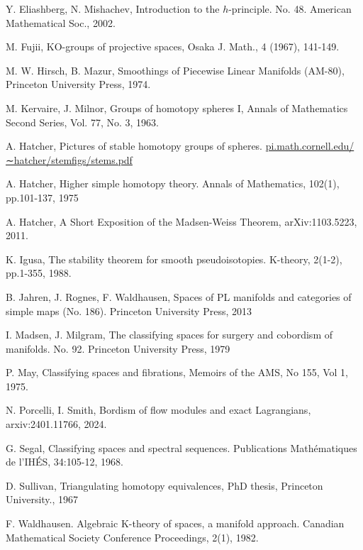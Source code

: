 \documentclass[reqno]{amsart}
\theoremstyle{theorem}
\theoremstyle{remark}
\theoremstyle{definition}
\begin{document}
\begin{thebibliography}{}
 Y. Eliashberg, N. Mishachev, Introduction to the $ h $-principle. No. 48. American Mathematical Soc., 2002.

 M. Fujii, KO-groups of projective spaces, Osaka J. Math., 4 (1967), 141-149.
   

 M. W. Hirsch, B. Mazur, Smoothings of Piecewise Linear Manifolds (AM-80), Princeton University Press, 1974.
  
 M. Kervaire, J. Milnor, Groups of homotopy spheres I, Annals of Mathematics Second Series, Vol. 77, No. 3, 1963.


 A. Hatcher, Pictures of stable homotopy groups of spheres. \url{pi.math.cornell.edu/∼hatcher/stemfigs/stems.pdf}

   
 A. Hatcher,  Higher simple homotopy theory. Annals of Mathematics, 102(1), pp.101-137, 1975
   
   
 A. Hatcher, A Short Exposition of the Madsen-Weiss Theorem, arXiv:1103.5223, 2011.


 K. Igusa, The stability theorem for smooth pseudoisotopies. K-theory, 2(1-2), pp.1-355, 1988.


 B. Jahren, J. Rognes,  F. Waldhausen, Spaces of PL manifolds and categories of simple maps (No. 186). Princeton University Press, 2013

 I. Madsen, J. Milgram, The classifying spaces for surgery and cobordism of manifolds. No. 92. Princeton University Press, 1979


 P. May, Classifying spaces and fibrations, Memoirs of the AMS, No 155, Vol 1, 1975.


 N. Porcelli, I. Smith, Bordism of flow modules and exact Lagrangians, arxiv:2401.11766, 2024.


 G. Segal, Classifying spaces and spectral sequences. Publications Mathématiques de l'IHÉS, 34:105-12, 1968.

 D. Sullivan, Triangulating homotopy equivalences, PhD thesis, Princeton University., 1967





   
 F. Waldhausen. Algebraic K-theory of spaces, a manifold approach. Canadian Mathematical Society Conference Proceedings, 2(1), 1982.




\end{thebibliography}
\end{document}
